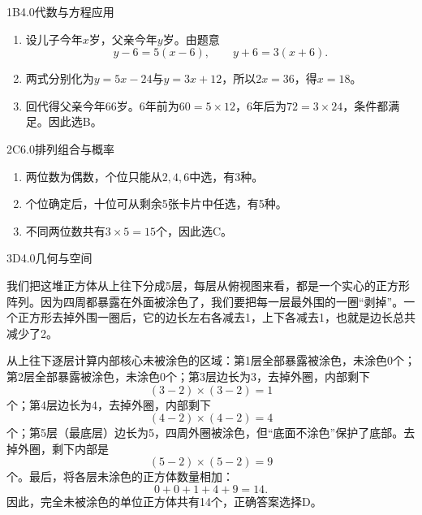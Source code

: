 

\begin{solution}{1}{B}{4.0}{代数与方程应用}
\begin{enumerate}[label=\textbf{Step \arabic*:},leftmargin=*]
  \item 设儿子今年\(x\)岁，父亲今年\(y\)岁。由题意
  \[
    y-6=5(x-6),\qquad y+6=3(x+6).
  \]
  \item 两式分别化为\(y=5x-24\)与\(y=3x+12\)，所以\(2x=36\)，得\(x=18\)。
  \item 回代得父亲今年66岁。6年前为\(60=5\times12\)，6年后为\(72=3\times24\)，条件都满足。因此选B。
\end{enumerate}
\end{solution}

\begin{solution}{2}{C}{6.0}{排列组合与概率}
\begin{enumerate}[label=\textbf{Step \arabic*:},leftmargin=*]
  \item 两位数为偶数，个位只能从\(2,4,6\)中选，有3种。
  \item 个位确定后，十位可从剩余5张卡片中任选，有5种。
  \item 不同两位数共有\(3\times5=15\)个，因此选C。
\end{enumerate}
\end{solution}

\begin{solution}{3}{D}{4.0}{几何与空间}

我们把这堆正方体从上往下分成5层，每层从俯视图来看，都是一个实心的正方形阵列。因为四周都暴露在外面被涂色了，我们要把每一层最外围的一圈“剥掉”。一个正方形去掉外围一圈后，它的边长左右各减去1，上下各减去1，也就是边长总共减少了2。

从上往下逐层计算内部核心未被涂色的区域：第1层全部暴露被涂色，未涂色0个；第2层全部暴露被涂色，未涂色0个；第3层边长为3，去掉外圈，内部剩下
\[
  (3-2)\times(3-2)=1
\]
个；第4层边长为4，去掉外圈，内部剩下
\[
  (4-2)\times(4-2)=4
\]
个；第5层（最底层）边长为5，四周外圈被涂色，但“底面不涂色”保护了底部。去掉外圈，剩下内部是
\[
  (5-2)\times(5-2)=9
\]
个。最后，将各层未涂色的正方体数量相加：
\[
  0+0+1+4+9=14.
\]
因此，完全未被涂色的单位正方体共有14个，正确答案选择D。

\end{solution}

